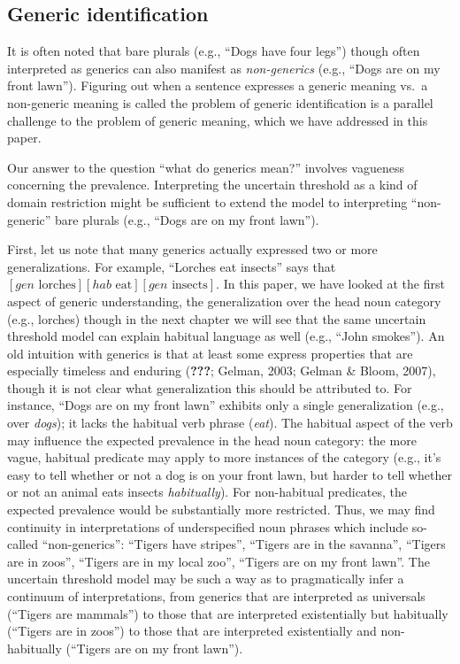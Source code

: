 \documentclass[floatsintext,man]{apa6}
\theoremstyle{definition}
\theoremstyle{definition}
\theoremstyle{definition}
\theoremstyle{remark}
\begin{document}
\subsection{Generic identification}\label{generic-identification}

It is often noted that bare plurals (e.g., \enquote{Dogs have four
legs}) though often interpreted as generics can also manifest as
\emph{non-generics} (e.g., \enquote{Dogs are on my front lawn}).
Figuring out when a sentence expresses a generic meaning vs.~a
non-generic meaning is called the problem of generic identification is a
parallel challenge to the problem of generic meaning, which we have
addressed in this paper.

Our answer to the question \enquote{what do generics mean?} involves
vagueness concerning the prevalence. Interpreting the uncertain
threshold as a kind of domain restriction might be sufficient to extend
the model to interpreting \enquote{non-generic} bare plurals (e.g.,
\enquote{Dogs are on my front lawn}).

First, let us note that many generics actually expressed two or more
generalizations. For example, \enquote{Lorches eat insects} says that
\([gen \text{ lorches}] [hab \text{ eat}] [gen \text{ insects}]\). In
this paper, we have looked at the first aspect of generic understanding,
the generalization over the head noun category (e.g., lorches) though in
the next chapter we will see that the same uncertain threshold model can
explain habitual language as well (e.g., \enquote{John smokes}). An old
intuition with generics is that at least some express properties that
are especially timeless and enduring ({\textbf{???}}; Gelman, 2003;
Gelman \& Bloom, 2007), though it is not clear what generalization this
should be attributed to. For instance, \enquote{Dogs are on my front
lawn} exhibits only a single generalization (e.g., over \emph{dogs}); it
lacks the habitual verb phrase (\emph{eat}). The habitual aspect of the
verb may influence the expected prevalence in the head noun category:
the more vague, habitual predicate may apply to more instances of the
category (e.g., it's easy to tell whether or not a dog is on your front
lawn, but harder to tell whether or not an animal eats insects
\emph{habitually}). For non-habitual predicates, the expected prevalence
would be substantially more restricted. Thus, we may find continuity in
interpretations of underspecified noun phrases which include so-called
\enquote{non-generics}: \enquote{Tigers have stripes}, \enquote{Tigers
are in the savanna}, \enquote{Tigers are in zoos}, \enquote{Tigers are
in my local zoo}, \enquote{Tigers are on my front lawn}. The uncertain
threshold model may be such a way as to pragmatically infer a continuum
of interpretations, from generics that are interpreted as universals
(\enquote{Tigers are mammals}) to those that are interpreted
existentially but habitually (\enquote{Tigers are in zoos}) to those
that are interpreted existentially and non-habitually (\enquote{Tigers
are on my front lawn}).
\end{document}
